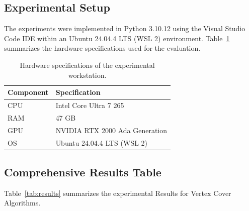\documentclass[sigconf]{acmart}
\begin{document}
\subsection{Experimental Setup}
The experiments were implemented in Python 3.10.12 using the Visual Studio Code IDE within an Ubuntu 24.04.4 LTS (WSL 2) environment. Table~\ref{tab:hardware} summarizes the hardware specifications used for the evaluation.

\begin{table}[h]
  \centering
  \caption{Hardware specifications of the experimental workstation.}
  \label{tab:hardware}
  \begin{tabular}{ll}
    \hline
    \textbf{Component} & \textbf{Specification}         \\ \hline
    CPU                & Intel Core Ultra 7 265         \\
    RAM                & 47 GB                          \\
    GPU                & NVIDIA RTX 2000 Ada Generation \\
    OS                 & Ubuntu 24.04.4 LTS (WSL 2)     \\ \hline
  \end{tabular}
\end{table}

\subsection{Comprehensive Results Table}
Table~\ref{tab:results} summarizes the experimental Results for Vertex Cover Algorithms.
\end{document}
